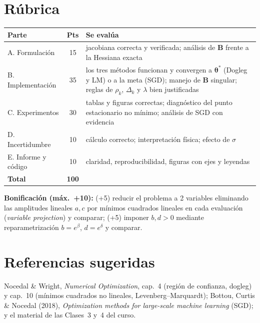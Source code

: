 \documentclass[11pt,letterpaper]{article}
\newcommand{\tht}{\boldsymbol{\theta}}
\begin{document}
\section{R\'ubrica}
\begin{center}
\begin{tabular}{@{}lcp{9.4cm}@{}}
\toprule
\textbf{Parte} & \textbf{Pts} & \textbf{Se eval\'ua}\\
\midrule
A. Formulaci\'on & 15 & jacobiana correcta y verificada; an\'alisis de $\mathbf B$ frente a la Hessiana exacta\\
B. Implementaci\'on & 35 & los tres m\'etodos funcionan y convergen a $\tht^\ast$ (Dogleg y LM) o a la meta (SGD); manejo de $\mathbf B$ singular; reglas de $\rho_k$, $\Delta_k$ y $\lambda$ bien justificadas\\
C. Experimentos & 30 & tablas y figuras correctas; diagn\'ostico del punto estacionario no m\'inimo; an\'alisis de SGD con evidencia\\
D. Incertidumbre & 10 & c\'alculo correcto; interpretaci\'on f\'isica; efecto de $\sigma$\\
E. Informe y c\'odigo & 10 & claridad, reproducibilidad, figuras con ejes y leyendas\\
\midrule
\textbf{Total} & \textbf{100} & \\
\bottomrule
\end{tabular}
\end{center}
\textbf{Bonificaci\'on (m\'ax.\ +10):} (+5) reducir el problema a 2 variables eliminando las amplitudes lineales
$a,c$ por m\'inimos cuadrados lineales en cada evaluaci\'on (\emph{variable projection}) y comparar; (+5) imponer
$b,d>0$ mediante reparametrizaci\'on $b=e^{\beta}$, $d=e^{\delta}$ y comparar.

\section{Referencias sugeridas}
Nocedal \& Wright, \emph{Numerical Optimization}, cap.~4 (regi\'on de confianza, dogleg) y cap.~10 (m\'inimos
cuadrados no lineales, Levenberg--Marquardt); Bottou, Curtis \& Nocedal (2018), \emph{Optimization methods for
large-scale machine learning} (SGD); y el material de las Clases~3 y~4 del curso.
\end{document}
